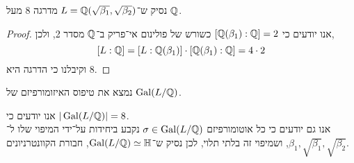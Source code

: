 \subquestion{}
נסיק ש־$L = \mathbb{Q}(\sqrt{\beta_1}, \sqrt{\beta_2})$ מדרגה 8 מעל $\mathbb{Q}$.
\begin{proof}
	אנו יודעים כי $[\mathbb{Q}(\beta_1) : \mathbb{Q}] = 2$ כשורש של פולינום אי־פריק ב־$\mathbb{Q}$ מסדר 2, ולכן,
	\[
		[L : \mathbb{Q}]
		= [L : \mathbb{Q}(\beta_1)] \cdot [\mathbb{Q}(\beta_1) : \mathbb{Q}]
		= 4 \cdot 2
	\]
	וקיבלנו כי הדרגה היא $8$.
\end{proof}

\subquestion{}
נמצא את טיפוס האיזומורפיזם של $\operatorname{Gal}(L / \mathbb{Q})$.
\begin{solution}
	אנו יודעים כי $|\operatorname{Gal}(L / \mathbb{Q})| = 8$. \\
	אנו גם יודעים כי כל אוטומורפיזם $\sigma \in \operatorname{Gal}(L / \mathbb{Q})$ נקבע ביחידות על־ידי המיפוי שלו ל־$\beta_1, \sqrt{\beta_1}, \sqrt{\beta_2}$, ושמיפוי זה בלתי תלוי,
	לכן נסיק ש־$\operatorname{Gal}(L / \mathbb{Q}) \simeq \mathbb{H}$, חבורת הקוונטרניונים.
\end{solution}


